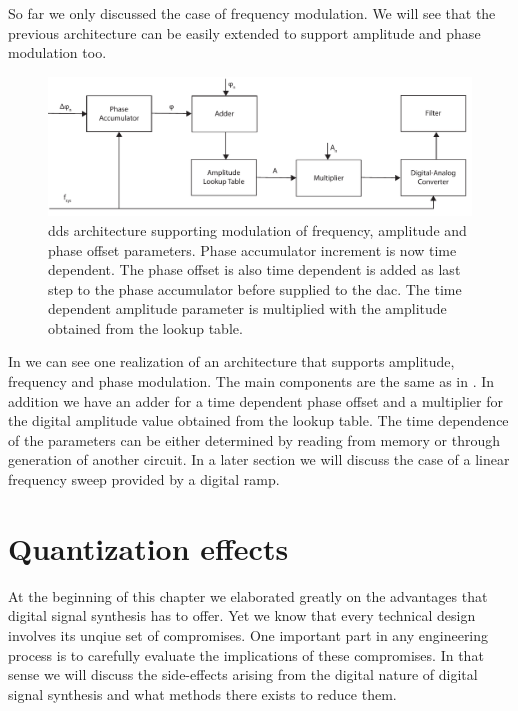 So far we only discussed the case of frequency modulation. We will see that
the previous architecture can be easily extended to support amplitude
and phase modulation too.
\begin{figure}[htb]
  \centering
  \includegraphics[width=\textwidth]
  {../figure/digital-signal-synthesis/modulation-architecture.pdf}
  \caption{\gls{dds} architecture supporting modulation of frequency,
    amplitude and phase offset parameters. Phase accumulator increment is now
    time dependent. The phase offset is also time dependent is added as last
    step to the phase accumulator before supplied to the \gls{dac}. The time
    dependent amplitude parameter is multiplied with the amplitude obtained
    from the lookup table.
    }\label{fig:dds_modulation_architecture}
\end{figure}
In  we can see one realization of an
architecture that supports amplitude, frequency and phase modulation. The main
components are the same as in . In addition
we have an adder for a time dependent phase offset and a multiplier for the
digital amplitude value obtained from the lookup table. The time dependence
of the parameters can be either determined by reading from memory or through
generation of another circuit. In a later section we will discuss the case of
a linear frequency sweep provided by a digital ramp.

\section{Quantization effects}

At the beginning of this chapter we elaborated greatly on the advantages that
digital signal synthesis has to offer. Yet we know that every technical design
involves its unqiue set of compromises. One important part in any engineering
process is to carefully evaluate the implications of these compromises. In
that sense we will discuss the side-effects arising from the digital nature of
digital signal synthesis and what methods there exists to reduce them.

